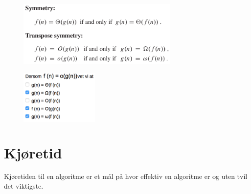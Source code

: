 \documentclass[12pt]{report}
\begin{document}
\vspace{\baselineskip}
\begin{multicols}{2}



\begin{figure}[H]
	\begin{Center}
		\includegraphics[width=3.13in,height=1.28in]{./media/image4.png}
	\end{Center}
\end{figure}



\par




\begin{figure}[H]
	\begin{Center}
		\includegraphics[width=1.52in,height=1.05in]{./media/image5.png}
	\end{Center}
\end{figure}



\par


\vspace{\baselineskip}

\end{multicols}

\vspace{\baselineskip}

\vspace{\baselineskip}\section*{Kjøretid}
\setlength{\parskip}{10.56pt}
Kjøretiden til en algoritme er et mål på hvor effektiv en algoritme er og uten tvil det viktigste.\par
\end{document}
